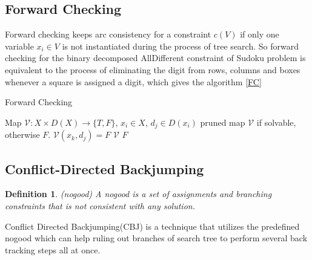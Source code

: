 \documentclass[a4paper, 12pt]{report}
\newtheorem{definition}{Definition}[subsection]
\begin{document}
        \subsection{Forward Checking}
            Forward checking keeps arc consistency for a constraint $c(V)$ if only one variable $x_i\in V$ is not instantiated during the process of tree search\cite{golomb1965backtrack}. So forward checking for the binary decomposed AllDifferent constraint of Sudoku problem is equivalent to the process of eliminating the digit from rows, columns and boxes whenever a square is assigned a digit, which gives the algorithm \ref{FC}
            \begin{algorithm}
                \caption{Forward Checking}
                \label{FC}
                \begin{algorithmic}[1]
                    \Require Map $\mathcal V:X\times D(X) \to \{T,F\}$, $x_i\in X$, $d_j\in D(x_i)$
                    \Ensure pruned map $\mathcal V$ if solvable, otherwise $F$.
                            \State $\mathcal V(x_k,d_j)=F$ 
                        \EndFor
                            \State \Return $\mathcal V$
                        \Else
                            \State \Return $F$
                        \EndIf
                    \EndFunction
                \end{algorithmic}
            \end{algorithm}

        \subsection{Conflict-Directed Backjumping}
            \begin{definition} (nogood) A nogood is a set of assignments and branching constraints that is not consistent with any solution\cite{rossi2006handbook}.
            \end{definition}

            Conflict Directed Backjumping(CBJ) is a technique that utilizes the predefined nogood which can help ruling out branches of search tree to perform several back tracking steps all at once\cite{prosser1993hybrid}.
\end{document}
